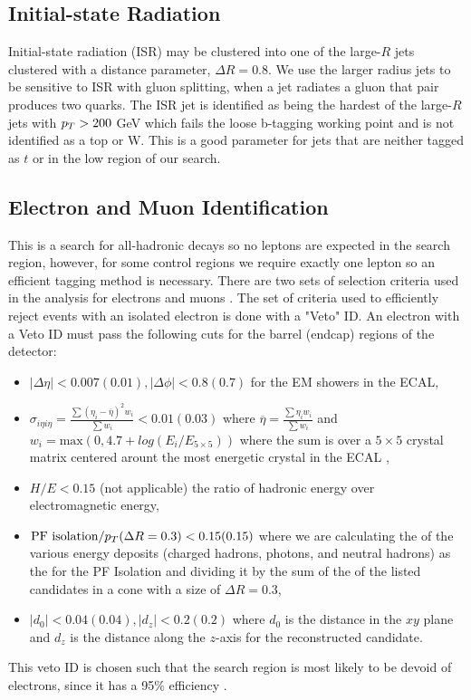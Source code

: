 \subsection{Initial-state Radiation}\label{ISRpt}

Initial-state radiation (ISR) may be clustered into one of the large-$R$ jets clustered with a distance parameter, $\Delta R=0.8$. We use the larger radius jets to be sensitive to ISR with gluon splitting, when a jet radiates a gluon that pair produces two quarks. The ISR jet is identified as being the hardest of the large-$R$ jets with $p_{T}>200$ GeV which fails the loose b-tagging working point and is not identified as a top or W. This is a good parameter for jets that are neither tagged as $t$ or \W{} in the low \dm{} region of our search.
 
\subsection{Electron and Muon Identification}\label{EleMuonID}
 This is a search for all-hadronic decays so no leptons are expected in the search region, however, for some control regions we require exactly one lepton so an efficient tagging method is necessary. There are two sets of selection criteria used in the analysis for electrons \cite{noauthor_performance_2015} and muons \cite{collaboration_performance_2013, cms_collaboration_performance_2018}. The set of criteria used to efficiently reject events with an isolated electron is done with a "Veto" ID. An electron with a Veto ID must pass the following cuts for the barrel (endcap) regions of the detector:
 \begin{itemize}
	 \item $|\Delta\eta|<0.007(0.01),|\Delta\phi|<0.8(0.7)$ for the EM showers in the ECAL,
	 \item $\sigma_{i\eta i\eta}=\frac{\sum(\eta_i-\overline{\eta})^2w_i}{\sum w_i}<0.01(0.03)$ where $\overline{\eta}=\frac{\sum\eta_iw_i}{\sum w_i}$ and $w_i=\text{max}(0,4.7+log(E_i/E_{5\times5}))$ where the sum is over a $5\times5$ crystal matrix centered arount the most energetic crystal in the ECAL \cite{collaboration_missing_2011},
	 \item $H/E<0.15$ (not applicable) the ratio of hadronic energy over electromagnetic energy,
	 \item $\text{PF isolation}/p_{T}(\Delta R=0.3)<0.15(0.15)$ where we are calculating the \pt{} of the various energy deposits (charged hadrons, photons, and neutral hadrons) as the \pt{} for the PF Isolation and dividing it by the sum of the \pt{} of the listed candidates in a cone with a size of $\Delta R=0.3$,
	 \item $|d_{0}|<0.04(0.04),|d_z|<0.2(0.2)$ where $d_0$ is the distance in the $xy$ plane and $d_z$ is the distance along the $z$-axis for the reconstructed candidate.
 \end{itemize}
This veto ID is chosen such that the search region is most likely to be devoid of electrons, since it has a 95\% efficiency \cite{noauthor_https://twiki.cern.ch/twiki/bin/view/cms/cutbasedelectronidentificationrun2_nodate}.
 
